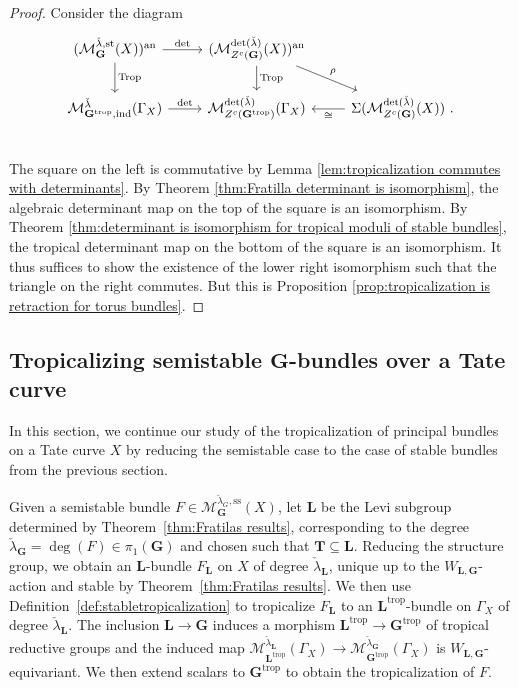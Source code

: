 \documentclass[10pt, a4paper]{amsart}
\theoremstyle{definition}
\theoremstyle{myitemstyle}
\newcommand{\lambdacheck}{\check{\lambda}}
\newcommand{\bfG}{\mathbf{G}}
\newcommand{\mc}[1]{{\mathcal{#1}}}
\DeclareMathOperator{\Trop}{Trop}
\newcommand{\an}{\mathrm{an}}
\newcommand{\st}{\mathrm{st}}
\newcommand{\ind}{\mathrm{ind}}
\newcommand{\trop}{{\mathrm{trop}}}
\newcommand{\Ga}{\Gamma}
\begin{document}
\begin{proof} Consider the diagram
\[
\begin{tikzcd}
    (\mc M_{\mathbf{G}}^{\lambdacheck,\st}(X))^\an \arrow[d,"\Trop"] \arrow[r,"\det"]&
        (\mc M_{Z^c(\mathbf{G})}^{\det(\lambdacheck)}(X))^\an \arrow[dr,"\rho"] \arrow[d,"\Trop"] &
        \\
    \mc M_{\bfG^\trop,\ind}^{\lambdacheck}(\Ga_X) \arrow[r,"\det"] &
        \mc M_{Z^c(\bfG^\trop)}^{\det(\lambdacheck)}(\Ga_X)&
            \Sigma(\mc M_{Z^c(\mathbf{G})}^{\det(\lambdacheck)}(X)) \ .\arrow[l,"\cong"]\\
\end{tikzcd}
\]
The square on the left is commutative by Lemma \ref{lem:tropicalization commutes with determinants}. By Theorem \ref{thm:Fratilla determinant is isomorphism}, the algebraic determinant map on the top of the square is an isomorphism. By Theorem \ref{thm:determinant is isomorphism for tropical moduli of stable bundles}, the tropical determinant map on the bottom of the square is an isomorphism. It thus suffices to show the existence of the lower right isomorphism such that the triangle on the right commutes. But this is Proposition \ref{prop:tropicalization is retraction for torus bundles}.
\end{proof}



\subsection{Tropicalizing semistable $\mathbf{G}$-bundles over a Tate curve} In this section, we continue our study of the tropicalization of principal bundles on a Tate curve $X$ by reducing the semistable case to the case of stable bundles from the previous section.

Given a semistable bundle $F\in\mc M_{\mathbf{G}}^{\lambdacheck_G,\mathrm{ss}}(X)$, let $\mathbf{L}$ be the Levi subgroup determined by Theorem~\ref{thm:Fratilas results}, corresponding to the degree $\lambdacheck_{\mathbf{G}}=\deg (F)\in \pi_1(\mathbf{G})$ and chosen such that $\mathbf{T}\subseteq \mathbf{L}$. Reducing the structure group, we obtain an $\mathbf{L}$-bundle $F_{\mathbf{L}}$ on $X$ of degree $\lambdacheck_{\mathbf{L}}$, unique up to the $W_{\mathbf{L},\mathbf{G}}$-action and stable by Theorem~\ref{thm:Fratilas results}. We then use Definition~\ref{def:stabletropicalization} to tropicalize $F_{\mathbf{L}}$ to an $\mathbf{L}^\trop$-bundle on $\Gamma_X$ of degree $\lambdacheck_{\mathbf{L}}$. The inclusion $\mathbf{L}\to \mathbf{G}$ induces a morphism $\mathbf{L}^\trop \to \mathbf{G}^\trop$ of tropical reductive groups and the induced map $\mc M_{\mathbf{L}^\trop}^{\lambdacheck_\mathbf{L}}(\Gamma_X)\to \mc M_{\mathbf{G}^\trop}^{\lambdacheck_\mathbf{G}}(\Gamma_X)$ is $W_{\mathbf{L},\mathbf{G}}$-equivariant. We then extend scalars to $\mathbf{G}^\trop$ to obtain the tropicalization of $F$.
\end{document}
